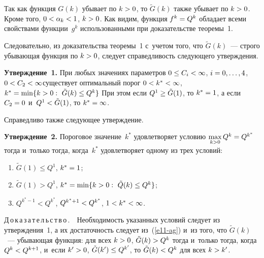 \begin{multicols}{2}
  Так как функция $G(k)$ убывает по $k\hm>0$, то $\tilde{G}(k)$ также 
убывает по $k\hm>0$. Кроме того, $0\hm< \alpha_k\hm<1$, $k\hm>0$. Как 
видим, функция $f^k\hm=Q^k$ обладает всеми свойствами функции~$g^k$ 
использованными при доказательстве теоремы~1. 
  
Следовательно, из доказательства теоремы~1 с~учетом того, что 
$\tilde{G}(k)$~--- строго убывающая функция по $k\hm>0$, следует 
справедливость следующего утверждения. 

\smallskip

\noindent
  \textbf{Утверждение~1.} При любых значениях па\-ра\-мет\-ров $0\hm\leq 
C_i\hm<\infty$, $i\hm=0,\ldots, 4$, $0\hm< C_2\hm<\infty$\linebreak существует 
оптимальный порог $0\hm< k^*\hm<\infty$, $k^*\hm=\min\{ k>0:\ 
\tilde{G}(k)\hm\leq Q^k\}$ При этом если $Q^1\hm\geq \tilde{G}(1)$, то 
$k^*\hm=1$, а если $C_2\hm=0$ и~$Q^1\hm<\tilde{G}(1)$, то $k^*\hm=\infty$.
  
  \smallskip
  
  Справедливо также следующее утверждение.
  
  \smallskip
  
  \noindent
  \textbf{Утверждение~2.} Пороговое значение~$k^*$ удовлетворяет 
условию $\max\limits_{k>0} Q^k\hm= Q^{k^*}$ тогда и~только тогда, 
когда~$k^*$ удовлетворяет одному из трех условий:
  \begin{enumerate}[(1)]
\item $\tilde{G}(1)\leq Q^1$, $k^*\hm=1$;
\item $\tilde{G}(1)>Q^1$, $k^*\hm= \min\{ k>0:\ \tilde{Q}(k)\hm\leq Q^k\}$;
\item $Q^{k^*-1}<Q^{k^*}$, $Q^{k^*+1}\hm< Q^{k^*}$, $1\hm< k^*\hm< 
\infty$.
\end{enumerate}
  
  \noindent
  Д\,о\,к\,а\,з\,а\,т\,е\,л\,ь\,с\,т\,в\,о\,.\ \ Необходимость указанных 
условий следует из утверждения~1, а их достаточность следует  
из~(\ref{e11-ag}) и~из того, что $\tilde{G}(k)$~--- убывающая функция: для всех 
$k\hm>0$, $\tilde{G}(k)\hm> Q^k$ тогда и~только тогда, когда $Q^k\hm< 
Q^{k+1}$, и~если $k^\prime \hm> 0$, $\tilde{G}(k^\prime) 
\hm\leq Q^{k^\prime}$, то  
$\tilde{G}(k) \hm< Q^k$ для всех $k\hm> k^\prime$.
  

\end{multicols}
